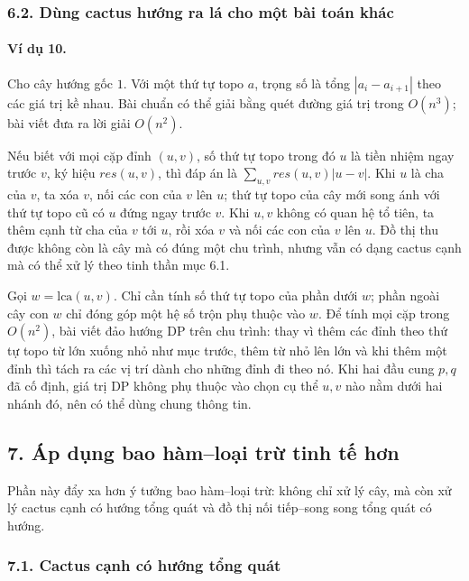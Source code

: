 \documentclass[11pt]{article}
\begin{document}
\subsubsection*{6.2. Dùng cactus hướng ra lá cho một bài toán khác}

\paragraph{Ví dụ 10.}
Cho cây hướng gốc \(1\). Với một thứ tự topo \(a\), trọng số là tổng
\(|a_i-a_{i+1}|\) theo các giá trị kề nhau. Bài chuẩn có thể giải bằng quét
đường giá trị trong \(O(n^3)\); bài viết đưa ra lời giải \(O(n^2)\).

Nếu biết với mọi cặp đỉnh \((u,v)\), số thứ tự topo trong đó \(u\) là tiền nhiệm
ngay trước \(v\), ký hiệu \(res(u,v)\), thì đáp án là
\(\sum_{u,v}res(u,v)|u-v|\). Khi \(u\) là cha của \(v\), ta xóa \(v\), nối các
con của \(v\) lên \(u\); thứ tự topo của cây mới song ánh với thứ tự topo cũ có
\(u\) đứng ngay trước \(v\). Khi \(u,v\) không có quan hệ tổ tiên, ta thêm cạnh
từ cha của \(v\) tới \(u\), rồi xóa \(v\) và nối các con của \(v\) lên \(u\).
Đồ thị thu được không còn là cây mà có đúng một chu trình, nhưng vẫn có dạng
cactus cạnh mà có thể xử lý theo tinh thần mục 6.1.


Gọi \(w=\mathrm{lca}(u,v)\). Chỉ cần tính số thứ tự topo của phần dưới \(w\);
phần ngoài cây con \(w\) chỉ đóng góp một hệ số trộn phụ thuộc vào \(w\). Để
tính mọi cặp trong \(O(n^2)\), bài viết đảo hướng DP trên chu trình: thay vì
thêm các đỉnh theo thứ tự topo từ lớn xuống nhỏ như mục trước, thêm từ nhỏ lên
lớn và khi thêm một đỉnh thì tách ra các vị trí dành cho những đỉnh đi theo nó.
Khi hai đầu cung \(p,q\) đã cố định, giá trị DP không phụ thuộc vào chọn cụ thể
\(u,v\) nào nằm dưới hai nhánh đó, nên có thể dùng chung thông tin.

\subsection*{7. Áp dụng bao hàm--loại trừ tinh tế hơn}

Phần này đẩy xa hơn ý tưởng bao hàm--loại trừ: không chỉ xử lý cây, mà còn xử
lý cactus cạnh có hướng tổng quát và đồ thị nối tiếp--song song tổng quát có
hướng.

\subsubsection*{7.1. Cactus cạnh có hướng tổng quát}
\end{document}
